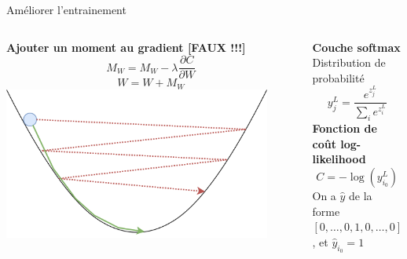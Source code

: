 \documentclass[10pt,xcolor={x11names}]{beamer}
\newcommand{\sectitle}[1]{{\large\color{titleblue}\textbf{#1}\\\smallskip}}
\begin{document}
\begin{frame}{Améliorer l'entrainement}
	\begin{columns}[T]
		\sectitle{Ajouter un moment au gradient [FAUX !!!]}
		$$
		M_W=M_W - \lambda \frac{\partial C}{\partial W}
		$$
		$$
		W=W + M_W
		$$
		{\centering \includegraphics[width=0.9\textwidth]{gradient.png}}
		
		\sectitle{Couche softmax}
		Distribution de probabilité
		$$
		y^L_j=\frac{e^{z_j^L}}{\sum_i e^{z_i^L}}
		$$
		\medskip
		\textbf{Fonction de coût log-likelihood}
		$$
		C=-\log(y^L_{i_0})
		$$
		On a $\hat{y}$ de la forme $[0,\dots,0,1,0,\dots,0]$, et $\hat{y}_{i_0}=1$
		
	\end{columns}
\end{frame}
\end{document}
